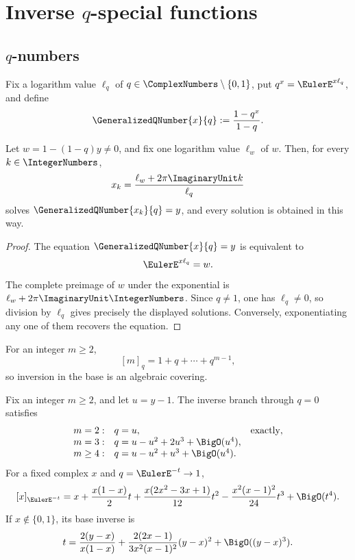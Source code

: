 \chapter{Inverse \texorpdfstring{\(q\)}{q}-special functions}
\label{chap:inverse-q-special-functions}

\section{\texorpdfstring{\(q\)-numbers}{q-numbers}}
\label{sec:qs-qnumbers}

Fix a logarithm value \(\ell_q\) of
\(q\in\ComplexNumbers\setminus\{0,1\}\), put
\(q^x=\EulerE^{x\ell_q}\), and define
\[
  \GeneralizedQNumber{x}{q}:=\frac{1-q^x}{1-q}.
\]

\begin{proposition}
\label{prop:qs-qnumber-x}
Let \(w=1-(1-q)y\ne0\), and fix one logarithm value \(\ell_w\) of \(w\).
Then, for every \(k\in\IntegerNumbers\),
\[
  x_k=\frac{\ell_w+2\pi\ImaginaryUnit k}{\ell_q}
\]
solves \(\GeneralizedQNumber{x_k}{q}=y\), and every solution is obtained in this way.
\end{proposition}

\begin{proof}
The equation \(\GeneralizedQNumber{x}{q}=y\) is equivalent to
\[
  \EulerE^{x\ell_q}=w.
\]
The complete preimage of \(w\) under the exponential is
\(\ell_w+2\pi\ImaginaryUnit\IntegerNumbers\).  Since \(q\ne1\), one has
\(\ell_q\ne0\), so division by \(\ell_q\) gives precisely the displayed
solutions.  Conversely, exponentiating any one of them recovers the equation.
\end{proof}

For an integer \(m\ge2\),
\[
  [m]_q=1+q+\cdots+q^{m-1},
\]
so inversion in the base is an algebraic covering.

\begin{proposition}
\label{prop:qs-qnumber-jets}
Fix an integer \(m\ge2\), and let \(u=y-1\).  The inverse branch through
\(q=0\) satisfies
\[
\begin{array}{rll}
 m=2:&q=u,&\text{exactly},\\
 m=3:&q=u-u^2+2u^3+\BigO(u^4),&\\
 m\ge4:&q=u-u^2+u^3+\BigO(u^4).&
\end{array}
\]
For a fixed complex \(x\) and \(q=\EulerE^{-t}\to1\),
\[
  [x]_{\EulerE^{-t}}
  =x+\frac{x(1-x)}2t
   +\frac{x(2x^2-3x+1)}{12}t^2
   -\frac{x^2(x-1)^2}{24}t^3+\BigO(t^4).
\]
If \(x\notin\{0,1\}\), its base inverse is
\[
  t=\frac{2(y-x)}{x(1-x)}
   +\frac{2(2x-1)}{3x^2(x-1)^2}(y-x)^2
   +\BigO((y-x)^3).
\]
\end{proposition}

